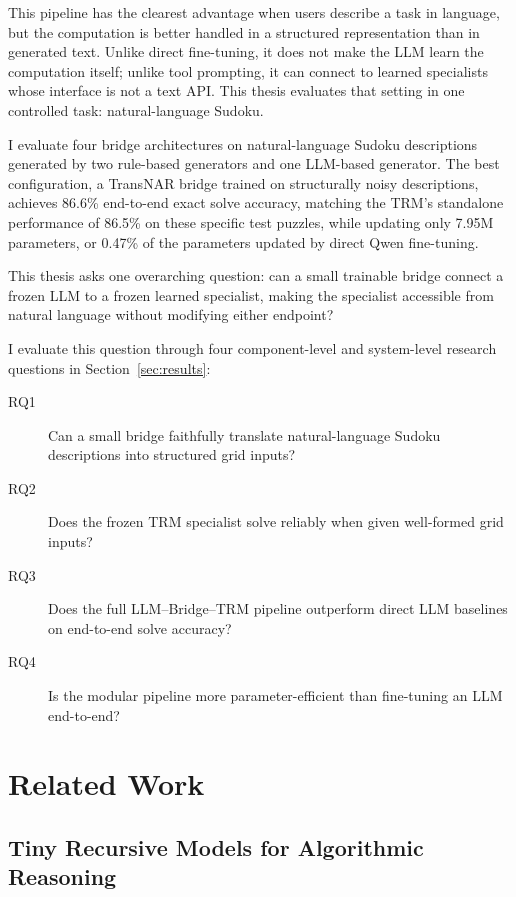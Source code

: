 \documentclass[11pt]{article}
\begin{document}
This pipeline has the clearest advantage when users describe a task in language, but the computation is better handled in a structured representation than in generated text.
Unlike direct fine-tuning, it does not make the LLM learn the computation itself; unlike tool prompting, it can connect to learned specialists whose interface is not a text API.
This thesis evaluates that setting in one controlled task: natural-language Sudoku.

I evaluate four bridge architectures on natural-language Sudoku descriptions generated by two rule-based generators and one LLM-based generator.
The best configuration, a TransNAR bridge trained on structurally noisy descriptions, achieves 86.6\% end-to-end exact solve accuracy, matching the TRM's standalone performance of 86.5\% on these specific test puzzles, while updating only 7.95M parameters, or 0.47\% of the parameters updated by direct Qwen fine-tuning.

This thesis asks one overarching question: can a small trainable bridge connect a frozen LLM to a frozen learned specialist, making the specialist accessible from natural language without modifying either endpoint?

I evaluate this question through four component-level and system-level research questions in Section~\ref{sec:results}:

\begin{description}
    \item[RQ1] Can a small bridge faithfully translate natural-language Sudoku descriptions into structured grid inputs?
    \item[RQ2] Does the frozen TRM specialist solve reliably when given well-formed grid inputs?
    \item[RQ3] Does the full LLM--Bridge--TRM pipeline outperform direct LLM baselines on end-to-end solve accuracy?
    \item[RQ4] Is the modular pipeline more parameter-efficient than fine-tuning an LLM end-to-end?
\end{description}

\section{Related Work}
\label{sec:related_work}

\subsection{Tiny Recursive Models for Algorithmic Reasoning}
\label{sec:tiny_recursive_models}
\end{document}
